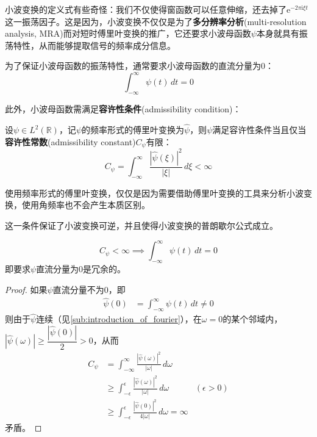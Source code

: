 小波变换的定义式有些奇怪：我们不仅使得窗函数可以任意伸缩，还去掉了$\mathrm{e}^{-2\pi \mathrm{i} \xi t}$这一振荡因子。这是因为，小波变换不仅仅是为了\textbf{多分辨率分析}(multi-resolution analysis, MRA)而对短时傅里叶变换的推广，它还要求小波母函数$\psi$本身就具有振荡特性，从而能够提取信号的频率成分信息。

为了保证小波母函数的振荡特性，通常要求小波母函数的直流分量为0\cite{mathematics_in_signal_processing}：
\[\int_{-\infty}^{\infty}\psi(t)\,dt=0\]

此外，小波母函数需满足\textbf{容许性条件}(admissibility condition)：
\begin{definition}[容许性条件]
    设$\psi\in L^2(\mathbb{R})$，记$\psi$的频率形式的傅里叶变换为$\hat{\psi}$，则$\psi$满足容许性条件当且仅当\textbf{容许性常数}(admissibility constant)$C_{\psi}$有限：
    \[C_{\psi}=\int_{-\infty}^{\infty}\frac{|\hat{\psi}(\xi)|^2}{|\xi|}\,d\xi<\infty\]
\end{definition}

使用频率形式的傅里叶变换，仅仅是因为需要借助傅里叶变换的工具来分析小波变换，使用角频率也不会产生本质区别。

这一条件保证了小波变换可逆，并且使得小波变换的普朗歇尔公式成立。

\begin{proposition}
    \[ C_{\psi}<\infty\implies\int_{-\infty}^{\infty}\psi(t)\,dt=0\]
    即要求$\psi$直流分量为0是冗余的。
\end{proposition}
\begin{proof}
    如果$\psi$直流分量不为0，即
    \begin{align*}
    \hat{\psi}(0)&=\int_{-\infty}^{\infty}\psi(t)\,dt\neq 0
    \end{align*}
    则由于$\hat{\psi}$连续（见\ref{sub:introduction_of_fourier}），在$\omega=0$的某个邻域内，$|\hat{\psi}(\omega)|\geq \dfrac{|\hat{\psi}(0)|}{2}>0$，从而
    \begin{align*}
        C_{\psi}&=\int_{-\infty}^{\infty}\frac{|\hat{\psi}(\omega)|^2}{|\omega|}\,d\omega\\
        &\geq \int_{-\epsilon}^{\epsilon}\frac{|\hat{\psi}(\omega)|^2}{|\omega|}\,d\omega&(\epsilon>0)\\
        &\geq \int_{-\epsilon}^{\epsilon}\frac{|\hat{\psi}(0)|^2}{4|\omega|}\,d\omega=\infty
    \end{align*}
    矛盾。
\end{proof}


